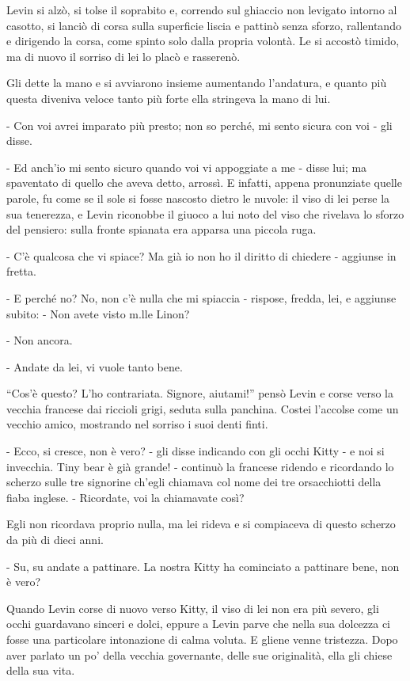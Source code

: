 Levin si alzò, si tolse il soprabito e, correndo sul ghiaccio non levigato intorno al casotto, si lanciò di corsa sulla superficie liscia e pattinò senza sforzo, rallentando e dirigendo la corsa, come spinto solo dalla propria volontà. Le si accostò timido, ma di nuovo il sorriso di lei lo placò e rasserenò. 

Gli dette la mano e si avviarono insieme aumentando l'andatura, e quanto più questa diveniva veloce tanto più forte ella stringeva la mano di lui. 

- Con voi avrei imparato più presto; non so perché, mi sento sicura con voi - gli disse. 

- Ed anch'io mi sento sicuro quando voi vi appoggiate a me - disse lui; ma spaventato di quello che aveva detto, arrossì. E infatti, appena pronunziate quelle parole, fu come se il sole si fosse nascosto dietro le nuvole: il viso di lei perse la sua tenerezza, e Levin riconobbe il giuoco a lui noto del viso che rivelava lo sforzo del pensiero: sulla fronte spianata era apparsa una piccola ruga. 

- C'è qualcosa che vi spiace? Ma già io non ho il diritto di chiedere - aggiunse in fretta. 

- E perché no? No, non c'è nulla che mi spiaccia - rispose, fredda, lei, e aggiunse subito: - Non avete visto m.lle Linon? 

- Non ancora. 

- Andate da lei, vi vuole tanto bene. 

``Cos'è questo? L'ho contrariata. Signore, aiutami!'' pensò Levin e corse verso la vecchia francese dai riccioli grigi, seduta sulla panchina. Costei l'accolse come un vecchio amico, mostrando nel sorriso i suoi denti finti. 

- Ecco, si cresce, non è vero? - gli disse indicando con gli occhi Kitty - e noi si invecchia. Tiny bear è già grande! - continuò la francese ridendo e ricordando lo scherzo sulle tre signorine ch'egli chiamava col nome dei tre orsacchiotti della fiaba inglese. - Ricordate, voi la chiamavate così? 

Egli non ricordava proprio nulla, ma lei rideva e si compiaceva di questo scherzo da più di dieci anni. 

- Su, su andate a pattinare. La nostra Kitty ha cominciato a pattinare bene, non è vero? 

Quando Levin corse di nuovo verso Kitty, il viso di lei non era più severo, gli occhi guardavano sinceri e dolci, eppure a Levin parve che nella sua dolcezza ci fosse una particolare intonazione di calma voluta. E gliene venne tristezza. Dopo aver parlato un po' della vecchia governante, delle sue originalità, ella gli chiese della sua vita. 

